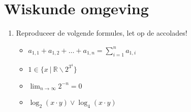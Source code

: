 \documentclass{article}
\begin{document}
\section{Wiskunde omgeving}
\begin{enumerate}
	\item Reproduceer de volgende formules, let op de accolades!
	\begin{itemize}
		\renewcommand{\labelitemi}{\(\circ\)}
			\item\(a_{1,1} + a_{1,2} + \ldots + a_{1,n} = \sum_{i = 1}^n a_{1,i}\)\\
			\item\( 1 \in \{ x~|~\mathbb{R} \backslash 2^{3^4} \}\)\\
			\item\(\lim_{n \to \infty} 2^{-n} = 0\)\\
			\item\(\log_2(x\cdot y) \lor \log_4(x\cdot y)\)
		\end{itemize}
		
\end{enumerate}
\end{document}
